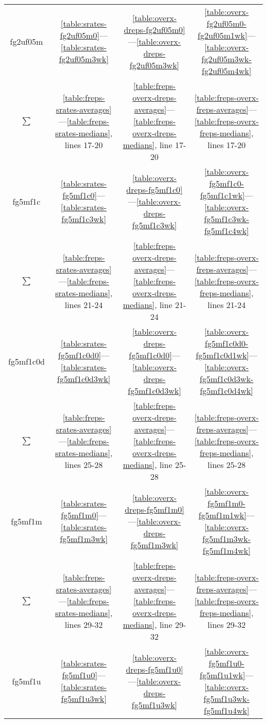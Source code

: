 \begin{table}
\begin{tabular}{|cccc|}
\hline
fg2uf05m & \ref{table:srates-fg2uf05m0}—\ref{table:srates-fg2uf05m3wk} & \ref{table:overx-dreps-fg2uf05m0}—\ref{table:overx-dreps-fg2uf05m3wk} & \ref{table:overx-fg2uf05m0-fg2uf05m1wk}—\ref{table:overx-fg2uf05m3wk-fg2uf05m4wk} \\
$\sum$ & \ref{table:freps-srates-averages}—\ref{table:freps-srates-medians}, lines 17-20 & \ref{table:freps-overx-dreps-averages}—\ref{table:freps-overx-dreps-medians}, line 17-20 & \ref{table:freps-overx-freps-averages}—\ref{table:freps-overx-freps-medians}, lines 17-20  \\
\hline
fg5mf1c & \ref{table:srates-fg5mf1c0}—\ref{table:srates-fg5mf1c3wk} & \ref{table:overx-dreps-fg5mf1c0}—\ref{table:overx-dreps-fg5mf1c3wk} & \ref{table:overx-fg5mf1c0-fg5mf1c1wk}—\ref{table:overx-fg5mf1c3wk-fg5mf1c4wk} \\
$\sum$ & \ref{table:freps-srates-averages}—\ref{table:freps-srates-medians}, lines 21-24 & \ref{table:freps-overx-dreps-averages}—\ref{table:freps-overx-dreps-medians}, line 21-24 & \ref{table:freps-overx-freps-averages}—\ref{table:freps-overx-freps-medians}, lines 21-24  \\
\hline
fg5mf1c0d & \ref{table:srates-fg5mf1c0d0}—\ref{table:srates-fg5mf1c0d3wk} & \ref{table:overx-dreps-fg5mf1c0d0}—\ref{table:overx-dreps-fg5mf1c0d3wk} & \ref{table:overx-fg5mf1c0d0-fg5mf1c0d1wk}—\ref{table:overx-fg5mf1c0d3wk-fg5mf1c0d4wk} \\
$\sum$ & \ref{table:freps-srates-averages}—\ref{table:freps-srates-medians}, lines 25-28 & \ref{table:freps-overx-dreps-averages}—\ref{table:freps-overx-dreps-medians}, line 25-28 & \ref{table:freps-overx-freps-averages}—\ref{table:freps-overx-freps-medians}, lines 25-28  \\
\hline
fg5mf1m & \ref{table:srates-fg5mf1m0}—\ref{table:srates-fg5mf1m3wk} & \ref{table:overx-dreps-fg5mf1m0}—\ref{table:overx-dreps-fg5mf1m3wk} & \ref{table:overx-fg5mf1m0-fg5mf1m1wk}—\ref{table:overx-fg5mf1m3wk-fg5mf1m4wk} \\
$\sum$ & \ref{table:freps-srates-averages}—\ref{table:freps-srates-medians}, lines 29-32 & \ref{table:freps-overx-dreps-averages}—\ref{table:freps-overx-dreps-medians}, line 29-32 & \ref{table:freps-overx-freps-averages}—\ref{table:freps-overx-freps-medians}, lines 29-32  \\
\hline
fg5mf1u & \ref{table:srates-fg5mf1u0}—\ref{table:srates-fg5mf1u3wk} & \ref{table:overx-dreps-fg5mf1u0}—\ref{table:overx-dreps-fg5mf1u3wk} & \ref{table:overx-fg5mf1u0-fg5mf1u1wk}—\ref{table:overx-fg5mf1u3wk-fg5mf1u4wk} \\

\end{tabular}
\end{table}
